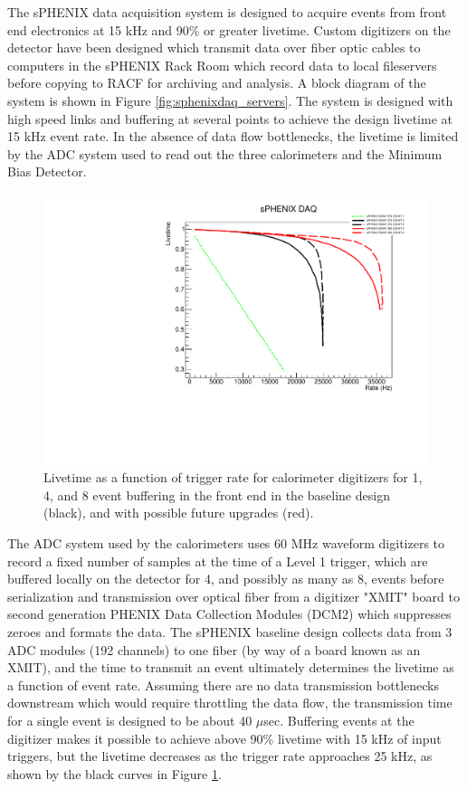 The sPHENIX data acquisition system is designed to acquire events from
front end electronics at 15 kHz and 90\% or greater livetime.
Custom digitizers on the detector have been designed which transmit data over fiber optic cables to computers in the sPHENIX Rack Room which record data to local
fileservers before copying to RACF for archiving and analysis.
A block diagram of the system is shown in Figure \ref{fig:sphenixdaq_servers}.
The system is designed with high speed links and buffering at several points to
achieve the design livetime at 15 kHz event rate.
In the absence of data flow bottlenecks, the livetime is limited by the
ADC system used to read out the three calorimeters and the Minimum Bias Detector.

\begin{figure}
    \centering
    \includegraphics[width=0.55\linewidth]{figs/sphenix_daqrate_3.pdf}
    \caption{Livetime as a function of trigger rate for calorimeter digitizers for
    1, 4, and 8 event buffering in the front end in the baseline design (black),
    and with possible future upgrades (red).}
    \label{fig:sphenix_daqrate}
\end{figure}

The ADC system used by the calorimeters uses 60 MHz waveform digitizers
to record a fixed number of samples at the time of a Level 1 trigger, 
which are buffered locally on the detector for 4, and possibly as many as 8,
events before serialization and transmission over optical fiber from a digitizer "XMIT" board to
second generation PHENIX Data Collection Modules (DCM2) which suppresses zeroes
and formats the data.
The sPHENIX baseline design collects data from 3 ADC modules  (192 channels) to one fiber (by way of a board known as an XMIT), and the time to transmit an event ultimately determines the livetime as a function of event rate.
Assuming there are no data transmission bottlenecks downstream 
which would require throttling the data flow, the transmission time for a single
event is designed to be about 40 $\mu$sec.  
Buffering events at the digitizer makes it possible to achieve above 90\% livetime 
with 15 kHz of input triggers, but the livetime decreases as the trigger
rate approaches 25 kHz, as shown by the black curves in Figure \ref{fig:sphenix_daqrate}.

